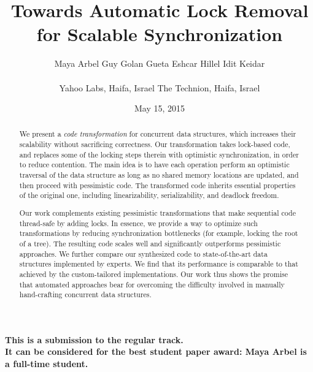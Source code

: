 \documentclass[11pt]{article}
\begin{document}
\begin{titlepage}

\title{Towards Automatic Lock Removal\\ for Scalable Synchronization}
\author{
Maya Arbel\footnotemark[1] \footnotemark[2] \hspace{0.3in} 
Guy Golan Gueta\footnotemark[1]  \hspace{0.3in}
Eshcar Hillel\footnotemark[1]  \hspace{0.3in}
Idit Keidar\footnotemark[1] \footnotemark[2]\\
\\
\large{
\footnotemark[1]Yahoo Labs, Haifa, Israel \hspace{0.3in} 
\footnotemark[2]The Technion, Haifa, Israel
}
}
\date{May 15, 2015}

\maketitle

\begin{abstract}
We present a \emph{code transformation} for concurrent data structures,
which increases their scalability without sacrificing correctness.
Our transformation takes lock-based code, and replaces some of the
locking steps therein with optimistic synchronization, in order to reduce contention. The main idea is to
have each operation perform an optimistic traversal of the data structure
as long as no shared memory locations are updated, and then proceed with
pessimistic code. The transformed code inherits essential
properties of the original one, including linearizability, serializability,
and deadlock freedom.

Our work complements existing pessimistic transformations that make
sequential code thread-safe by adding locks.
In essence, we provide a way to optimize such transformations by reducing
synchronization bottlenecks (for example, locking the root of a tree).
The resulting code scales well and significantly outperforms
pessimistic approaches. We further compare our synthesized code to state-of-the-art
data structures implemented by experts.
We find that its performance is comparable %
to that achieved by the custom-tailored implementations.
Our work thus shows the promise that automated approaches
bear for overcoming the difficulty involved in manually
hand-crafting concurrent data structures.

\end{abstract}

\bigskip\bigskip
\noindent
{\bf
This is a submission to the regular track.\\
It can be considered for the best student paper award:
Maya Arbel is a full-time student.}

\thispagestyle{empty}
\end{titlepage}	
\end{document}
